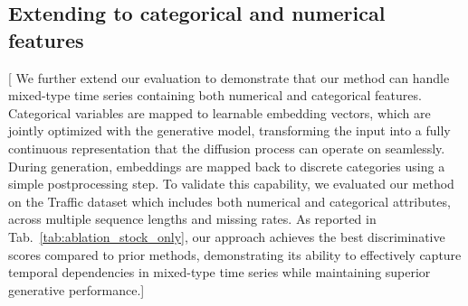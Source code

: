 \documentclass{article}
\theoremstyle{plain}
\theoremstyle{definition}
\theoremstyle{remark}
\newcommand {\idan}[1]{{\color{red}[#1]}}
\begin{document}
\vspace{-2mm}
\subsection{Extending to categorical and numerical features}
\vspace{-2mm}
\idan{
We further extend our evaluation to demonstrate that our method can handle mixed-type time series containing both numerical and categorical features. Categorical variables are mapped to learnable embedding vectors, which are jointly optimized with the generative model, transforming the input into a fully continuous representation that the diffusion process can operate on seamlessly. During generation, embeddings are mapped back to discrete categories using a simple postprocessing step. To validate this capability, we evaluated our method on the Traffic dataset which includes both numerical and categorical attributes, across multiple sequence lengths and missing rates. As reported in Tab.~\ref{tab:ablation_stock_only}, our approach achieves the best discriminative scores compared to prior methods, demonstrating its ability to effectively capture temporal dependencies in mixed-type time series while maintaining superior generative performance.}

\begin{table}[t]
\renewcommand{\arraystretch}{1}
\centering
\caption{\idan{Discriminative scores of the ablation study with 30\%, 50\%, and 70\% drop-rate on the Traffic dataset for sequence lengths of $24 , \text{and } 96$.}}
\label{tab:ablation_stock_only}
\end{table}
\end{document}
